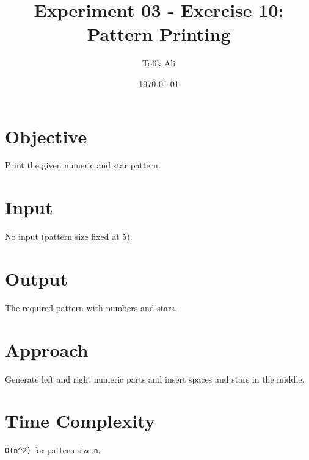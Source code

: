 \documentclass[11pt]{article}
\title{Experiment 03 - Exercise 10: Pattern Printing}
\author{Tofik Ali}
\date{\today}
\begin{document}
\maketitle
\section*{Objective}
Print the given numeric and star pattern.
\section*{Input}
No input (pattern size fixed at 5).
\section*{Output}
The required pattern with numbers and stars.
\section*{Approach}
Generate left and right numeric parts and insert spaces and stars in the middle.
\section*{Time Complexity}
\texttt{O(n^2)} for pattern size \texttt{n}.
\end{document}
